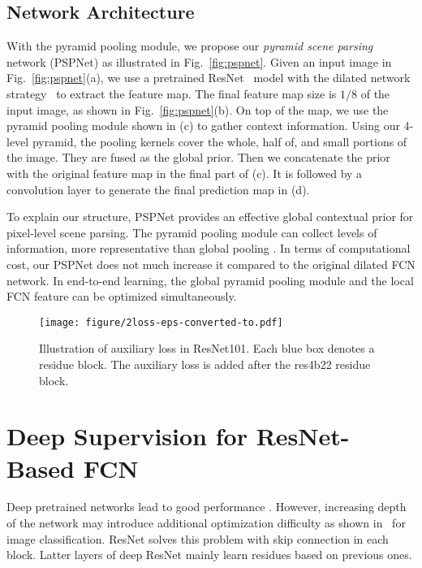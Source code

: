 \documentclass[10pt,twocolumn,letterpaper]{article}
\begin{document}
\subsection{Network Architecture}

With the pyramid pooling module, we propose our {\it pyramid scene parsing} network
(PSPNet) as illustrated in Fig.~\ref{fig:pspnet}. Given an input image in
Fig.~\ref{fig:pspnet}(a), we use a pretrained ResNet~\cite{he2015deep} model with the
dilated network strategy~\cite{chen2014semantic,yu2015multi} to extract the feature map.
The final feature map size is $1/8$ of the input image, as shown in
Fig.~\ref{fig:pspnet}(b). On top of the map, we use the pyramid pooling module shown in
(c) to gather context information. Using our 4-level pyramid, the pooling kernels cover
the whole, half of, and small portions of the image. They are fused as the global prior.
Then we concatenate the prior with the original feature map in the final part of (c). It
is followed by a convolution layer to generate the final prediction map in (d).

To explain our structure, PSPNet provides an effective global contextual prior for
pixel-level scene parsing. The pyramid pooling module can collect levels of information,
more representative than global pooling \cite{liu2015parsenet}. In terms of computational
cost, our PSPNet does not much increase it compared to the original dilated FCN network.
In end-to-end learning, the global pyramid pooling module and the local FCN feature can
be optimized simultaneously.

\begin{figure}[t]
\begin{center}
    \texttt{[image: figure/2loss-eps-converted-to.pdf]}
\end{center}
\caption{Illustration of auxiliary loss in ResNet101. Each blue box denotes a residue
block. The auxiliary loss is added after the res4b22 residue block. }
\label{fig:auxiliaryloss}
\end{figure}

\section{Deep Supervision for ResNet-Based FCN}
Deep pretrained networks lead to good performance
\cite{krizhevsky2012imagenet,simonyan2014very,he2015deep}. However, increasing depth of
the network may introduce additional optimization difficulty as shown
in~\cite{shen2016relay,lee2015deeply} for image classification. ResNet solves this
problem with skip connection in each block. Latter layers of deep ResNet mainly learn
residues based on previous ones.
\end{document}
